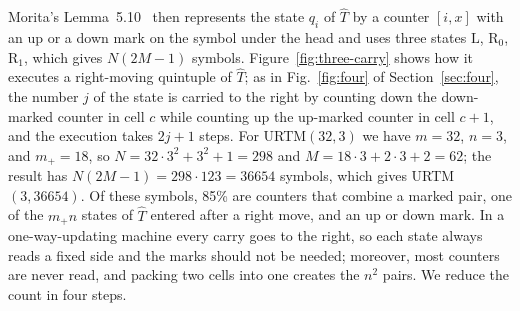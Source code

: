 \documentclass{article}
\theoremstyle{definition}
\theoremstyle{remark}
\newcommand{\rmL}{\mathrm{L}}
\newcommand{\rmR}{\mathrm{R}}
\begin{document}
Morita's Lemma~5.10~\cite{Morita17} then represents the state $q_i$ of $\hat T$ by a counter $[i,x]$ with an up or a down mark on the symbol under the head and uses three states $\rmL$, $\rmR_0$, $\rmR_1$, which gives $N(2M-1)$ symbols.
Figure~\ref{fig:three-carry} shows how it executes a right-moving quintuple of $\hat T$; as in Fig.~\ref{fig:four} of Section~\ref{sec:four}, the number $j$ of the state is carried to the right by counting down the down-marked counter in cell $c$ while counting up the up-marked counter in cell $c+1$, and the execution takes $2j+1$ steps.
For URTM$(32,3)$ we have $m=32$, $n=3$, and $m_+=18$, so $N=32\cdot 3^2+3^2+1=298$ and $M=18\cdot 3+2\cdot 3+2=62$; the result has $N(2M-1)=298\cdot 123=36654$ symbols, which gives URTM$(3,36654)$.
Of these symbols, 85\% are counters that combine a marked pair, one of the $m_+n$ states of $\hat T$ entered after a right move, and an up or down mark.
In a one-way-updating machine every carry goes to the right, so each state always reads a fixed side and the marks should not be needed; moreover, most counters are never read, and packing two cells into one creates the $n^2$ pairs.
We reduce the count in four steps.
\end{document}
